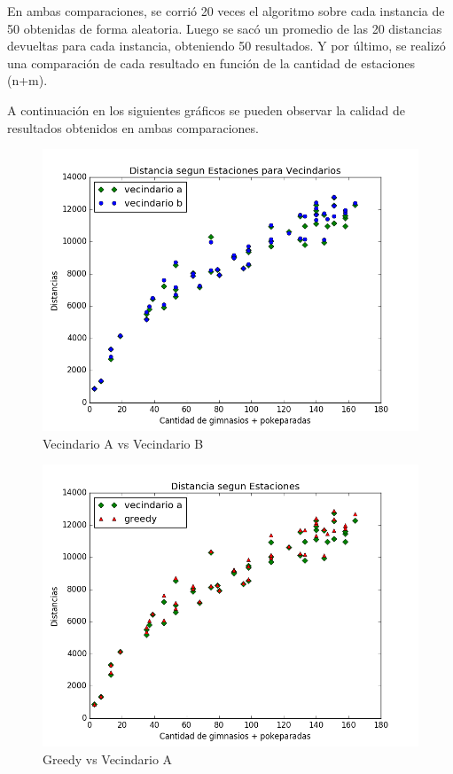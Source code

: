              En ambas comparaciones, se corrió 20 veces el algoritmo sobre cada instancia de 50 obtenidas de forma aleatoria. Luego se sacó un promedio de las 20 distancias devueltas para cada instancia, obteniendo 50 resultados. Y por último, se realizó una comparación de cada resultado en función de la cantidad de estaciones (n+m).
             
             \par A continuación en los siguientes gráficos se pueden observar la calidad de resultados obtenidos en ambas comparaciones.

\blindtext

  \begin{figure}[H]
      \begin{center}
        \includegraphics[width=0.7\columnwidth]{imagenes/Ej3/Exp3Ej3ABDistancia.png}
        \caption{Vecindario A vs Vecindario B}
      \end{center}
  \end{figure}

    \begin{figure}[H]
      \begin{center}
        \includegraphics[width=0.7\columnwidth]{imagenes/Ej3/Exp3Ej3AGDistancia.png}
        \caption{Greedy vs Vecindario A}
      \end{center}
  \end{figure}

